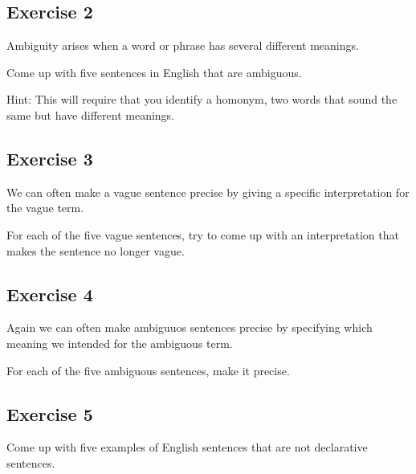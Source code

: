 \documentclass[
paper=128mm:96mm, %
fontsize=11pt, %
pagesize, %
parskip=half-, %
]{scrartcl} %
\theoremstyle{mythmstyle} %
\begin{document}
\clearpage

\subsection{Exercise 2}

Ambiguity arises when a word or phrase has several different meanings.

Come up with five sentences in English that are ambiguous.

Hint: This will require that you identify a homonym, two words that sound the same but have different meanings.

\clearpage

\subsection{Exercise 3}

We can often make a vague sentence precise by giving a specific interpretation for the vague term.

For each of the five vague sentences, try to come up with an interpretation that makes the sentence no longer vague.

\clearpage

\subsection{Exercise 4}

Again we can often make ambiguuos sentences precise by specifying which meaning we intended for the ambiguous term.

For each of the five ambiguous sentences, make it precise.

\clearpage

\subsection{Exercise 5}

Come up with five examples of English sentences that are not declarative sentences.
\clearpage




\thispagestyle{empty} %




\clearpage
\end{document}
